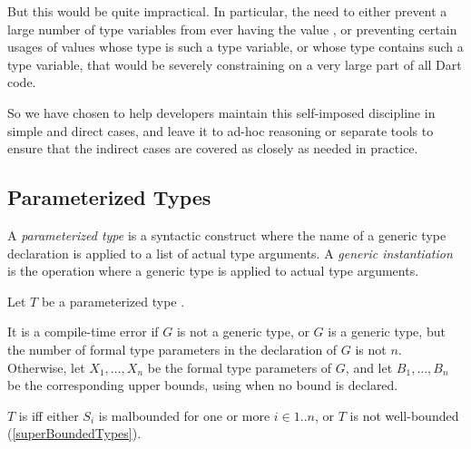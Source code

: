 \documentclass[makeidx]{article}
\begin{document}
{{But this would be quite impractical.
In particular, the need to either prevent a large number of type variables
from ever having the value \VOID,
or preventing certain usages of values whose type is such a type variable,
or whose type contains such a type variable,
that would be severely constraining on a very large part of all Dart code.

So we have chosen to help developers maintain this self-imposed discipline
in simple and direct cases,
and leave it to ad-hoc reasoning or separate tools to ensure
that the indirect cases are covered as closely as needed in practice.%
}


\subsection{Parameterized Types}


\LMHash{}%
A \emph{parameterized type} is a syntactic construct
where the name of a generic type declaration is applied to
a list of actual type arguments.
A \emph{generic instantiation} is the operation where
a generic type is applied to actual type arguments.


\LMHash{}%
Let $T$ be a parameterized type .

\LMHash{}%
It is a compile-time error if $G$ is not a generic type,
or $G$ is a generic type,
but the number of formal type parameters in the declaration of $G$ is not $n$.
Otherwise, let
$X_1, \ldots, X_n$
be the formal type parameters of $G$, and let
$B_1, \ldots, B_n$
be the corresponding upper bounds, using \DYNAMIC{} when no bound is declared.

\LMHash{}%
$T$ is  if{}f either
$S_i$ is malbounded for one or more $i \in 1 .. n$,
or $T$ is not well-bounded (\ref{superBoundedTypes}).

}
\end{document}
